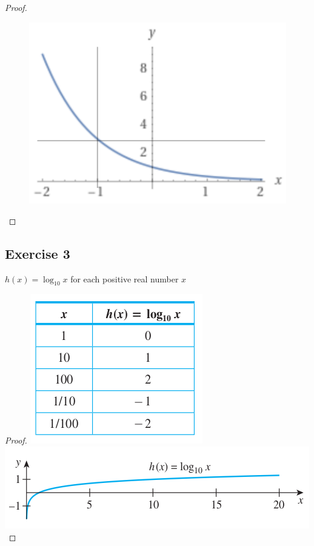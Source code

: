 \documentclass[14pt]{extarticle}
\begin{document}
\begin{proof}
    \begin{figure}[ht!]
        \centering
        \includegraphics[scale=0.5]{../images/11.4.2.png}
    \end{figure}
\end{proof}

\subsection{Exercise 3}
\(h(x) = \log_{10} x\) for each positive real number \(x\)

\begin{proof}
    \includegraphics[scale=0.5]{../images/11.4.3.1.png}
    \includegraphics[scale=0.5]{../images/11.4.3.2.png}
\end{proof}
\end{document}
